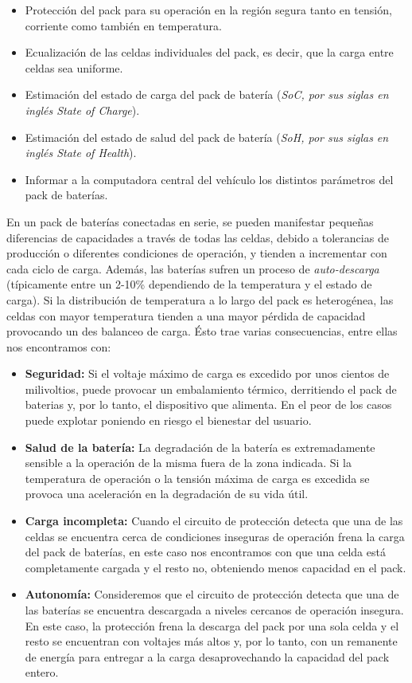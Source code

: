 \documentclass[10pt,a4paper]{article}
\begin{document}
	\begin{itemize}
		\item Protección del pack para su operación en la región segura tanto en tensión, corriente como también en temperatura.
		\item Ecualización de las celdas individuales del pack, es decir, que la carga entre celdas sea uniforme.
		\item Estimación del estado de carga del pack de batería (\emph{SoC, por sus siglas en inglés State of Charge}).
		\item Estimación del estado de salud del pack de batería (\emph{SoH, por sus siglas en inglés State of Health}).
		\item Informar a la computadora central del vehículo los distintos parámetros del pack de baterías.
	\end{itemize}
	
	\noindent En un pack de baterías conectadas en serie, se pueden manifestar pequeñas diferencias de capacidades a través de todas las celdas, debido a tolerancias de producción o diferentes condiciones de operación, y tienden a incrementar con cada ciclo de carga. Además, las baterías sufren un proceso de \emph{auto-descarga} (típicamente entre un 2-10\% dependiendo de la temperatura y el estado de carga). Si la distribución de temperatura a lo largo del pack es heterogénea, las celdas con mayor temperatura tienden a una mayor pérdida de capacidad provocando un des balanceo de carga. Ésto trae varias consecuencias, entre ellas nos encontramos con:
	
	\begin{itemize}
		\item \textbf{Seguridad:} Si el voltaje máximo de carga es excedido por unos cientos de milivoltios, puede provocar un embalamiento térmico, derritiendo el pack de baterias y, por lo tanto, el dispositivo que alimenta. En el peor de los casos puede explotar poniendo en riesgo el bienestar del usuario.
		\item \textbf{Salud de la batería:} La degradación de la batería es extremadamente sensible a la operación de la misma fuera de la zona indicada. Si la temperatura de operación o la tensión máxima de carga es excedida se provoca una aceleración en la degradación de su vida útil.
		\item \textbf{Carga incompleta:} Cuando el circuito de protección detecta que una de las celdas se encuentra cerca de condiciones inseguras de operación frena la carga del pack de baterías, en este caso nos encontramos con que una celda está completamente cargada y el resto no, obteniendo menos capacidad en el pack.
		\item \textbf{Autonomía:} Consideremos que el circuito de protección detecta que una de las baterías se encuentra descargada a niveles cercanos de operación insegura. En este caso, la protección frena la descarga del pack por una sola celda y el resto se encuentran con voltajes más altos y, por lo tanto, con un remanente de energía para entregar a la carga desaprovechando la capacidad del pack entero.
	\end{itemize}
	
\end{document}
